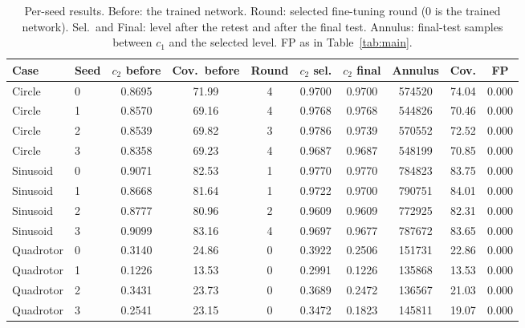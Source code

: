 \begin{table}[t]
\centering\footnotesize\setlength{\tabcolsep}{3pt}
\caption{Per-seed results. Before: the trained network. Round: selected fine-tuning round (0 is the trained network). Sel.\ and Final: level after the retest and after the final test. Annulus: final-test samples between $c_1$ and the selected level. FP as in Table~\ref{tab:main}.}
\label{tab:seeds}
\begin{tabular}{llcccccccc}
\toprule
Case & Seed & $c_2$ before & Cov.\ before & Round & $c_2$ sel. & $c_2$ final & Annulus & Cov. & FP\\
\midrule
Circle & 0 & 0.8695 & 71.99 & 4 & 0.9700 & 0.9700 & 574520 & 74.04 & 0.000\\
Circle & 1 & 0.8570 & 69.16 & 4 & 0.9768 & 0.9768 & 544826 & 70.46 & 0.000\\
Circle & 2 & 0.8539 & 69.82 & 3 & 0.9786 & 0.9739 & 570552 & 72.52 & 0.000\\
Circle & 3 & 0.8358 & 69.23 & 4 & 0.9687 & 0.9687 & 548199 & 70.85 & 0.000\\
Sinusoid & 0 & 0.9071 & 82.53 & 1 & 0.9770 & 0.9770 & 784823 & 83.75 & 0.000\\
Sinusoid & 1 & 0.8668 & 81.64 & 1 & 0.9722 & 0.9700 & 790751 & 84.01 & 0.000\\
Sinusoid & 2 & 0.8777 & 80.96 & 2 & 0.9609 & 0.9609 & 772925 & 82.31 & 0.000\\
Sinusoid & 3 & 0.9099 & 83.16 & 4 & 0.9697 & 0.9677 & 787672 & 83.65 & 0.000\\
Quadrotor & 0 & 0.3140 & 24.86 & 0 & 0.3922 & 0.2506 & 151731 & 22.86 & 0.000\\
Quadrotor & 1 & 0.1226 & 13.53 & 0 & 0.2991 & 0.1226 & 135868 & 13.53 & 0.000\\
Quadrotor & 2 & 0.3431 & 23.73 & 0 & 0.3689 & 0.2472 & 136567 & 21.03 & 0.000\\
Quadrotor & 3 & 0.2541 & 23.15 & 0 & 0.3472 & 0.1823 & 145811 & 19.07 & 0.000\\
\bottomrule
\end{tabular}
\end{table}
